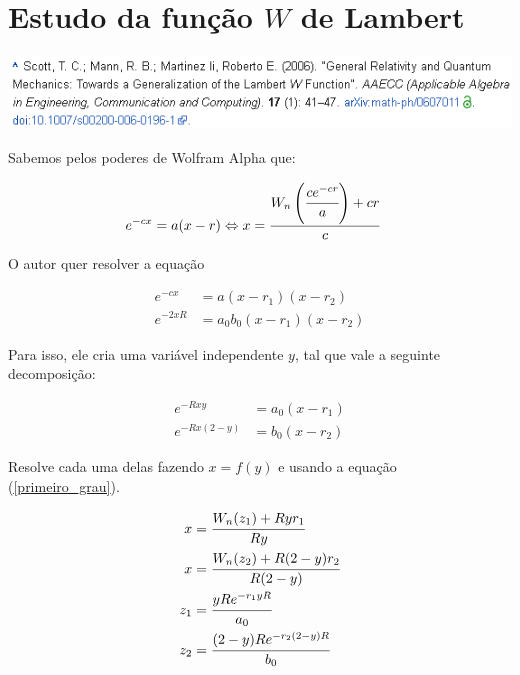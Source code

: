 \documentclass[11pt,a4paper]{article}
\begin{document}
\section{Estudo da fun\c{c}\~ao $W$ de Lambert}

		\begin{center}
		\includegraphics[scale=1]{referencia}
		\end{center}

\vspace{3mm}

Sabemos pelos poderes de Wolfram Alpha que:

\begin{align}
  e^{-cx} &= a (x - r) \Leftrightarrow x = \cfrac{W_n\left(\cfrac{c e^{-cr}}{a} \right) + cr}{c} \label{primeiro_grau}
\end{align}

\vspace{3mm}

O autor quer resolver a equa\c{c}\~ao

\begin{align}
  e^{-cx} &= a (x - r_1) (x - r_2) \\
  e^{-2xR} &= a_0 b_0 (x - r_1) (x - r_2)
\end{align}

\vspace{3mm}

Para isso, ele cria uma vari\'avel independente $y$, tal que vale a seguinte decomposi\c{c}\~ao:

\begin{align}
  e^{-Rxy} &= a_0 (x - r_1) \\
  e^{-Rx(2 - y)} &= b_0 (x - r_2)
\end{align}

Resolve cada uma delas fazendo $x = f(y)$ e usando a equa\c{c}\~ao (\underline{\color{blue}\ref{primeiro_grau}}).

\begin{align}
  x &= \cfrac{W_n(z_1) + Ryr_1}{Ry} \\
  x &= \cfrac{W_n(z_2) + R(2 - y)r_2}{R(2 - y)} \\
  z_1 &= \cfrac{yRe^{-r_1yR}}{a_0} \\
  z_2 &= \cfrac{(2-y)Re^{-r_2(2-y)R}}{b_0}
\end{align}
\end{document}
